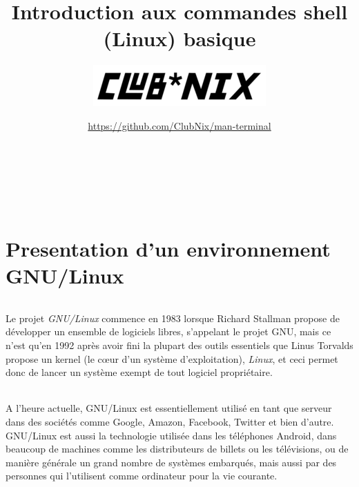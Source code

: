 \documentclass[french, a4paper, 12pt, titlepage]{article}
\begin{document}
\title{Introduction aux commandes shell (Linux) basique}
\author{\includegraphics[scale=0.7]{clubnix}}
\date{\url{https://github.com/ClubNix/man-terminal}}

\maketitle

\vfill
\pagebreak
\newpage
\thispagestyle{empty}
~


\strut\thispagestyle{empty}
\vfill
\pagebreak
\tableofcontents
\strut\thispagestyle{empty}

\vfill
\pagebreak
\newpage
\thispagestyle{empty}
~
\pagebreak

\setcounter{page}{1}

\part{Presentation d'un environnement GNU/Linux}

\paragraph{}
Le projet \textit{GNU/Linux} commence en 1983 lorsque Richard Stallman propose
de développer un ensemble de logiciels libres, s'appelant le projet GNU, mais
ce n'est qu'en 1992 après avoir fini la plupart des outils essentiels que Linus
Torvalds propose un kernel (le cœur d'un système d'exploitation),
\textit{Linux}, et ceci permet donc de lancer un système exempt de tout
logiciel propriétaire.

\paragraph{}
A l'heure actuelle, GNU/Linux est essentiellement utilisé en tant que serveur
dans des sociétés comme Google, Amazon, Facebook, Twitter et bien d'autre.
GNU/Linux est aussi la technologie utilisée dans les téléphones Android, dans
beaucoup de machines comme les distributeurs de billets ou les télévisions, ou
de manière générale un grand nombre de systèmes embarqués, mais aussi par des
personnes qui l'utilisent comme ordinateur pour la vie courante.
\end{document}
